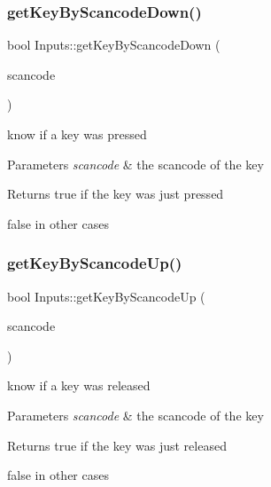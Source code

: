 \subsubsection{\texorpdfstring{get\+Key\+By\+Scancode\+Down()}{getKeyByScancodeDown()}}
{\footnotesize\ttfamily bool Inputs\+::get\+Key\+By\+Scancode\+Down (\begin{DoxyParamCaption}\item[{S\+D\+L\+\_\+\+Scancode}]{scancode }\end{DoxyParamCaption})\hspace{0.3cm}{\ttfamily [static]}}



know if a key was pressed 


\begin{DoxyParams}{Parameters}
{\em scancode} & the scancode of the key \\
\hline
\end{DoxyParams}
\begin{DoxyReturn}{Returns}
true if the key was just pressed 

false in other cases 
\end{DoxyReturn}
\mbox{\label{class_inputs_a6617b70e3838546047d5701704276826}} 
\subsubsection{\texorpdfstring{get\+Key\+By\+Scancode\+Up()}{getKeyByScancodeUp()}}
{\footnotesize\ttfamily bool Inputs\+::get\+Key\+By\+Scancode\+Up (\begin{DoxyParamCaption}\item[{S\+D\+L\+\_\+\+Scancode}]{scancode }\end{DoxyParamCaption})\hspace{0.3cm}{\ttfamily [static]}}



know if a key was released 


\begin{DoxyParams}{Parameters}
{\em scancode} & the scancode of the key \\
\hline
\end{DoxyParams}
\begin{DoxyReturn}{Returns}
true if the key was just released 

false in other cases 
\end{DoxyReturn}
\mbox{\label{class_inputs_a212767ed4b6e8e66046fbc0ec04d7137}} 
